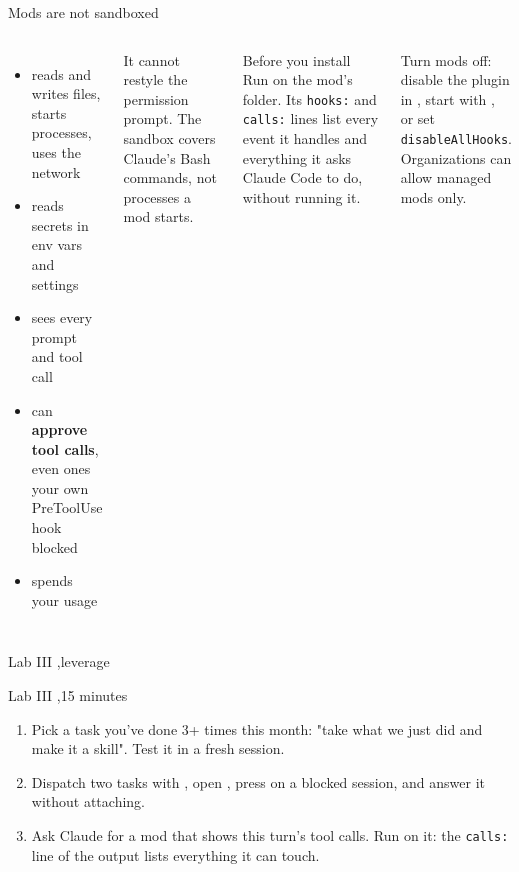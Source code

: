 \documentclass[aspectratio=169,11pt,t]{beamer}
\begin{document}
\begin{frame}{Mods are not sandboxed}
  \begin{columns}[T,onlytextwidth]
      \par\vspace{0.3em}
      \begin{itemize}\small\setlength\itemsep{0.15em}
        \item reads and writes files, starts processes, uses the network
        \item reads secrets in env vars and settings
        \item sees every prompt and tool call
        \item can \textbf{approve tool calls}, even ones your own PreToolUse hook blocked
        \item spends your usage
      \end{itemize}
      {\footnotesize\color{muted}It cannot restyle the permission prompt. The sandbox covers Claude's Bash commands, not processes a mod starts.}
      \begin{callout}[warn]{Before you install}
        Run  on the mod's folder. Its \texttt{hooks:} and \texttt{calls:} lines list every event it handles and everything it asks Claude Code to do, without running it.
      \end{callout}
      \footnotesize Turn mods off: disable the plugin in , start with , or set \texttt{disableAllHooks}. Organizations can allow managed mods only.
  \end{columns}
\end{frame}

\setsec{}
\begin{frame}{Lab III \sep leverage}
  \begin{lab}{Lab III \sep 15 minutes}
    \begin{enumerate}\setlength\itemsep{0.5em}
      \item Pick a task you've done 3+ times this month: "take what we just did and make it a skill". Test it in a fresh session.
      \item Dispatch two tasks with , open , press  on a blocked session, and answer it without attaching.
      \item Ask Claude for a mod that shows this turn's tool calls. Run  on it: the \texttt{calls:} line of the output lists everything it can touch.
    \end{enumerate}
  \end{lab}
\end{frame}
\end{document}
